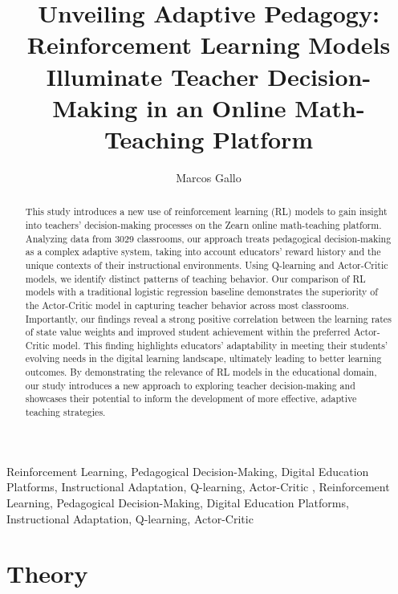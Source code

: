 \documentclass[
  number,
  preprint,
  3p,
  onecolumn]{elsarticle}
\begin{document}
\begin{frontmatter}
\title{Unveiling Adaptive Pedagogy: Reinforcement Learning Models
Illuminate Teacher Decision-Making in an Online Math-Teaching Platform}
\author[]{Marcos Gallo%
%
}




        
\begin{abstract}
This study introduces a new use of reinforcement learning (RL) models to
gain insight into teachers' decision-making processes on the Zearn
online math-teaching platform. Analyzing data from 3029 classrooms, our
approach treats pedagogical decision-making as a complex adaptive
system, taking into account educators' reward history and the unique
contexts of their instructional environments. Using Q-learning and
Actor-Critic models, we identify distinct patterns of teaching behavior.
Our comparison of RL models with a traditional logistic regression
baseline demonstrates the superiority of the Actor-Critic model in
capturing teacher behavior across most classrooms. Importantly, our
findings reveal a strong positive correlation between the learning rates
of state value weights and improved student achievement within the
preferred Actor-Critic model. This finding highlights educators'
adaptability in meeting their students' evolving needs in the digital
learning landscape, ultimately leading to better learning outcomes. By
demonstrating the relevance of RL models in the educational domain, our
study introduces a new approach to exploring teacher decision-making and
showcases their potential to inform the development of more effective,
adaptive teaching strategies.
\end{abstract}





\begin{keyword}
    Reinforcement Learning, Pedagogical Decision-Making, Digital
Education Platforms, Instructional Adaptation, Q-learning,
Actor-Critic \sep 
    Reinforcement Learning, Pedagogical Decision-Making, Digital
Education Platforms, Instructional Adaptation, Q-learning, Actor-Critic
\end{keyword}
\end{frontmatter}
    

\section{Theory}\label{theory}
\end{document}
